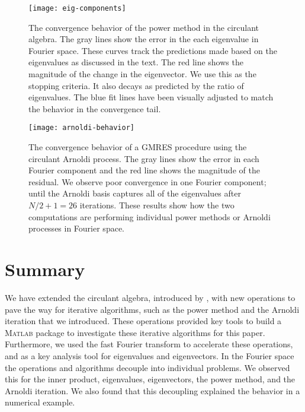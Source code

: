 \documentclass[1p,authoryear,letterpaper]{elsarticle}
\newcommand{\Matlab}{\textsc{Matlab}\xspace}
\begin{document}
\begin{figure}[t]
\begin{minipage}{0.46\linewidth}
\texttt{[image: eig-components]}
\caption{The convergence behavior of the power
method in the circulant algebra. The gray lines show
the error in the each eigenvalue in Fourier space.
These curves track the predictions made based
on the eigenvalues as discussed in the text.
The red line shows the magnitude of the change
in the eigenvector.  We use this as the stopping
criteria.  It also decays as predicted by the
ratio of eigenvalues. The blue fit lines have
been visually adjusted to match the behavior
in the convergence tail.   }
\label{fig:experiment-power}
\end{minipage}
\hfil
\begin{minipage}{0.46\linewidth}
\texttt{[image: arnoldi-behavior]}
\caption{The convergence behavior of a
GMRES procedure using the circulant Arnoldi process.
The gray lines show the error in each Fourier
component and the red line shows the magnitude
of the residual.  We observe poor convergence
in one Fourier component; until the Arnoldi basis
captures all of the eigenvalues after $N/2+1=26$ iterations.
These results show how the two computations are
performing individual power methods or Arnoldi processes
in Fourier space.}
\label{fig:experiment-arnoldi}
\end{minipage}


\end{figure}


\section{Summary}
\label{sec:conclusion}





We have extended the circulant algebra, introduced
by \citet{kilmer2008-circ-tensor-svd}, with new
operations 
to pave the way for
iterative algorithms, such as the power method
and the Arnoldi iteration that we introduced.
These operations
provided key tools to build a \Matlab package 
to investigate these iterative algorithms for this paper.
Furthermore, we used the fast Fourier transform to accelerate 
these operations, 
and as a key analysis tool for eigenvalues
and eigenvectors. 
In the Fourier space the operations and algorithms decouple into individual problems.
We observed this for the inner product, eigenvalues,
eigenvectors, the power method, and the Arnoldi iteration.
We also found that this decoupling explained the behavior 
in a numerical example. 
\end{document}
